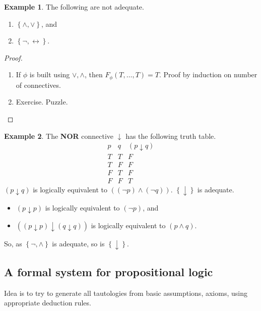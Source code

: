 \documentclass{article}
\newcommand{\rb}[1]{\left( #1 \right)}
\newcommand{\cb}[1]{\left\{ #1 \right\}}
\newcommand{\notb}[1]{\rb{\neg #1}}
\newcommand{\andb}[2]{\rb{#1 \land #2}}
\theoremstyle{definition}\newtheorem{definition}{Definition}[subsection]
\theoremstyle{definition}\newtheorem{remark1}[definition]{Remark}
\theoremstyle{definition}\newtheorem{example1}[definition]{Example}
\theoremstyle{definition}\newtheorem*{remark2}{Remark}
\theoremstyle{definition}\newtheorem*{example2}{Example}
\theoremstyle{definition}\newtheorem*{note}{Note}
\theoremstyle{definition}\newtheorem*{notation}{Notation}
\begin{document}
\begin{example1}
The following are not adequate.
\begin{enumerate}
\item $ \cb{\land, \lor} $, and
\item $ \cb{\neg, \leftrightarrow} $.
\end{enumerate}
\end{example1}

\begin{proof}
\hfill
\begin{enumerate}
\item If $ \phi $ is built using $ \lor, \land $, then $ F_\phi\rb{T, \dots, T} = T $. Proof by induction on number of connectives.
\item Exercise. Puzzle.
\end{enumerate}
\end{proof}

\begin{example1}
The \textbf{NOR} connective $ \downarrow $ has the following truth table.
$$
\begin{array}{cc|c}
p & q & \rb{p \downarrow q} \\
\hline
T & T & F \\
T & F & F \\
F & T & F \\
F & F & T
\end{array}
$$
$ \rb{p \downarrow q} $ is logically equivalent to $ \andb{\notb{p}}{\notb{q}} $. $ \cb{\downarrow} $ is adequate.
\begin{itemize}
\item $ \rb{p \downarrow p} $ is logically equivalent to $ \notb{p} $, and
\item $ \rb{\rb{p \downarrow p} \downarrow \rb{q \downarrow q}} $ is logically equivalent to $ \andb{p}{q} $.
\end{itemize}
So, as $ \cb{\neg, \land} $ is adequate, so is $ \cb{\downarrow} $.
\end{example1}

\pagebreak

\subsection{A formal system for propositional logic}

Idea is to try to generate all tautologies from basic assumptions, axioms, using appropriate deduction rules.
\end{document}
